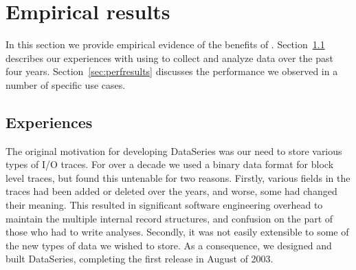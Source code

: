 \section{Empirical results}\label{sec:experience}
In this section we provide empirical evidence of the benefits of \DataSeries{}.
Section~\ref{sec:experiences} describes our experiences with using
\DataSeries{} to collect and analyze data over the past four years.
Section~\ref{sec:perfresults} discusses the performance we observed
in a number of specific use cases. 

\subsection{Experiences}\label{sec:experiences}
The original motivation for developing DataSeries was our need to
store various types of I/O traces. For over a decade we used a
binary data format for block level traces,
but found this untenable for two
reasons. Firstly, various fields in the traces had been added or
deleted over the years, and worse, some had changed their
meaning. This resulted in significant software engineering overhead
to maintain the multiple internal record structures, and confusion on the
part of those who had to write analyses. Secondly, it was not easily
extensible to some of the new types of data we wished to store. As a
consequence, we designed and built DataSeries, completing the first
release in August of 2003.  

